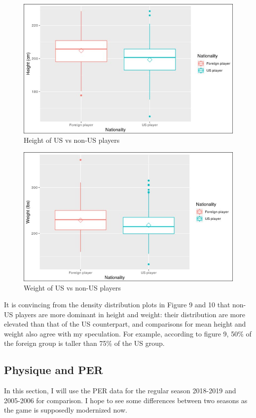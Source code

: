 \documentclass[a4paper,12pt,twoside]{article}
\numberwithin{equation}{section}
\begin{document}
\begin{figure}[h]
\caption{Height of US vs non-US players}
\includegraphics[scale=0.33]{fush.jpg}
\centering
\end{figure}

\begin{figure}[h]
\caption{Weight of US vs non-US players}
\includegraphics[scale=0.33]{fusw.jpg}
\centering
\end{figure}

It is convincing from the density distribution plots in Figure 9 and 10 that non-US players are more dominant in height and weight: their distribution are more elevated than that of the US counterpart, and comparisons for mean height and weight also agree with my speculation. For example, according to figure 9, 50\% of the foreign group is taller than 75\% of the US group.

\subsection{Physique and PER}
In this section, I will use the PER data for the
 regular season 2018-2019 and 2005-2006 for comparison. I hope to see some differences between two seasons as the game is supposedly modernized now.
 
\end{document}
